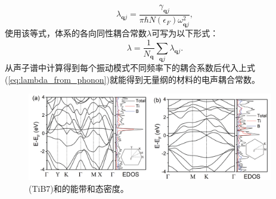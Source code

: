 \begin{equation}
  \lambda_{\bm{q}j} =
  \frac{\gamma_{\bm{q}j}}{\pi \hbar N(\epsilon_F) \omega^2_{\bm{q}j}},
\end{equation}
使用该等式，体系的各向同性耦合常数$\lambda$可写为以下形式：
\begin{equation}\label{eq:lambda_from_phonon}
  \lambda = \frac{1}{N_{\bm{q}}}\sum_{\bm{q}j} \lambda_{\bm{q}j}.
\end{equation}
从声子谱中计算得到每个振动模式不同频率下的耦合系数后代入上式(\ref{eq:lambda_from_phonon})就能得到无量纲的材料的电声耦合常数。

\begin{figure}
  \includegraphics[width=0.96\textwidth]{figs/ch5_bands.png}
  \centering
  \caption{\ce(TiB7)和的能带和态密度。}
  \label{fig:ch5_bands}
\end{figure}

